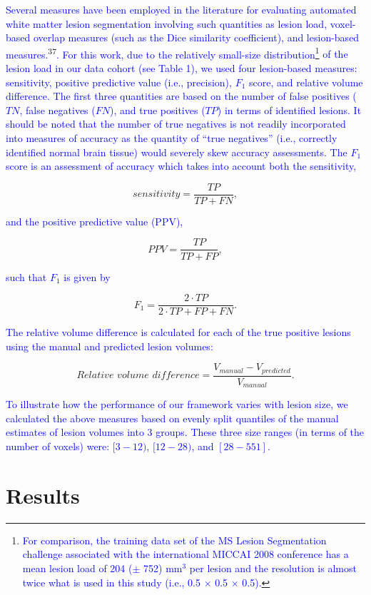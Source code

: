 \documentclass[11pt,]{article}
\let\rmarkdownfootnote\footnote%
\def\footnote{\protect\rmarkdownfootnote}
\begin{document}
\textcolor{blue}{Several measures have been employed in the literature for evaluating
automated white matter lesion segmentation involving such quantities as lesion load,
voxel-based overlap measures (such as the Dice similarity coefficient), and lesion-based measures.}\textsuperscript{37}\textcolor{blue}{.  For this work, due to the relatively small-size distribution}\footnote{\textcolor{blue}{For comparison, the training data set of
  the MS Lesion Segmentation challenge
  associated with the international MICCAI 2008 conference has a mean lesion load of
  204 ($\pm$ 752) mm$^3$ per lesion and the resolution is almost twice what is used
  in this study (i.e., 0.5 $\times$ 0.5 $\times$ 0.5).}}
\textcolor{blue}{of the lesion load in our data cohort (see Table 1), we used
four lesion-based measures:  sensitivity, positive predictive value (i.e., precision), $F_1$ score, and relative volume difference.  The first three quantities are based on the number of false positives ($TN$, false negatives ($FN$), and true positives ($TP$) in terms of identified lesions.  It should be noted that the number of true negatives is not readily
incorporated into measures of accuracy as the quantity of ``true negatives'' (i.e., correctly identified normal brain tissue) would severely skew accuracy assessments. The $F_1$ score is an assessment of accuracy which takes into account both the sensitivity,}

\[ sensitivity =  \frac{ TP }{TP + FN}, \]

\textcolor{blue}{and the positive predictive value (PPV),}

\[ PPV =  \frac{ TP }{TP + FP}, \]

\textcolor{blue}{such that $F_1$ is given by}

\[ F_1 =  \frac{ 2 \cdot TP }{ 2 \cdot TP + FP + FN}. \]

\textcolor{blue}{The relative volume difference is calculated for each of the true positive lesions using
the manual and predicted lesion volumes:}

\[ Relative\,\,volume\,\,difference = \frac{V_{manual} - V_{predicted}}{V_{manual}}. \]

\textcolor{blue}{To illustrate how the performance of our framework varies with lesion size, we calculated
the above measures based on evenly split quantiles of the manual estimates of lesion volumes into 3 groups.  These three size ranges (in terms of the number of voxels) were:  $[3-12)$, $[12-28)$, and $[28-551]$.}

\section{Results}\label{results}
\end{document}

